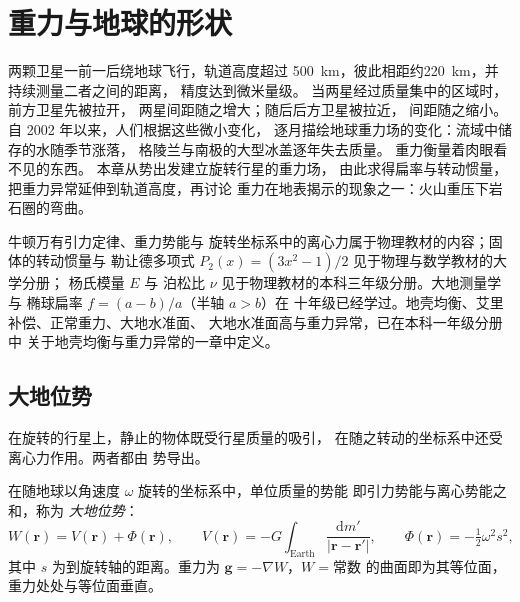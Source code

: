 \chapter{重力与地球的形状}\label{ch:b3:gravity-geodesy}

两颗卫星一前一后绕地球飞行，轨道高度超过
\qty{500}{km}，彼此相距约\qty{220}{km}，并持续测量二者之间的距离，
精度达到微米量级。
当两星经过质量集中的区域时，前方卫星先被拉开，
两星间距随之增大；随后后方卫星被拉近，
间距随之缩小。自 2002 年以来，人们根据这些微小变化，
逐月描绘地球重力场的变化：流域中储存的水随季节涨落，
格陵兰与南极的大型冰盖逐年失去质量。
重力衡量着肉眼看不见的东西。
本章从势出发建立旋转行星的重力场，
由此求得扁率与转动惯量，
把重力异常延伸到轨道高度，再讨论
重力在地表揭示的现象之一：火山重压下岩石圈的弯曲。

\begin{recall}
牛顿万有引力定律、重力势能与
旋转坐标系中的离心力属于物理教材的内容；固体的转动惯量与
勒让德多项式 $P_2(x) = (3x^2 - 1)/2$ 见于物理与数学教材的大学分册；
杨氏模量 $E$ 与
泊松比 $\nu$ 见于物理教材的本科三年级分册。大地测量学与
椭球扁率 $f = (a - b)/a$（半轴 $a > b$）在
十年级已经学过。地壳均衡、艾里补偿、正常重力、大地水准面、
大地水准面高与重力异常，已在本科一年级分册中
关于地壳均衡与重力异常的一章中定义。
\end{recall}

\section{大地位势}

在旋转的行星上，静止的物体既受行星质量的吸引，
在随之转动的坐标系中还受离心力作用。两者都由
势导出。

\begin{definition}[大地位势]\label{def:b3:gravity-geodesy:geopotential}
在随地球以角速度 $\omega$ 旋转的坐标系中，单位质量的势能
即引力势能与离心势能之和，称为
\emph{大地位势}：
\[
  W(\mathbf r) = V(\mathbf r) + \Phi(\mathbf r),\qquad
  V(\mathbf r) = -G\int_{\text{Earth}}\frac{\mathrm dm'}{|\mathbf r - \mathbf r'|},\qquad
  \Phi(\mathbf r) = -\tfrac12\omega^2 s^2,
\]
其中 $s$ 为到旋转轴的距离。重力为
$\mathbf g = -\nabla W$，$W = \text{常数}$ 的曲面即为其等位面，
重力处处与等位面垂直。
\end{definition}

